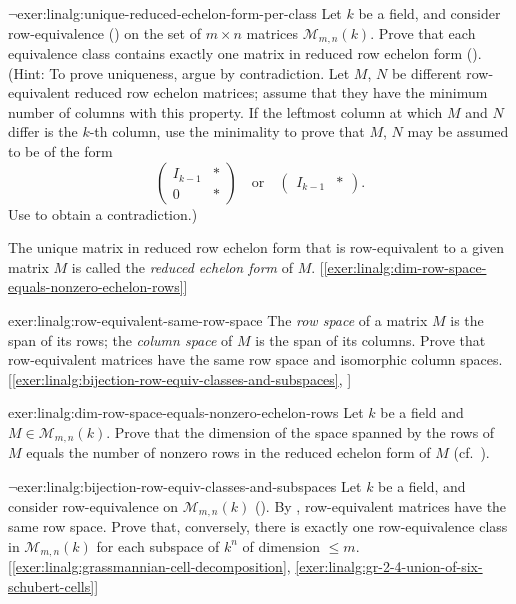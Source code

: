 \begin{exer}{$\lnot$}{exer:linalg:unique-reduced-echelon-form-per-class}
  Let $k$ be a field, and consider row-equivalence
  () on the
  set of $m \times n$ matrices $\mathcal{M}_{m,n}(k)$. Prove that each
  equivalence class contains exactly one matrix in reduced row echelon
  form
  (). (Hint:
  To prove uniqueness, argue by contradiction. Let $M$, $N$ be
  different row-equivalent reduced row echelon matrices; assume that
  they have the minimum number of columns with this property. If the
  leftmost column at which $M$ and $N$ differ is the $k$-th column,
  use the minimality to prove that $M$, $N$ may be assumed to be of
  the form
  \[
    \left(\begin{array}{c|c} I_{k-1} & * \\ \hline 0 &
        * \end{array}\right) \quad \text{or} \quad
    \left(\begin{array}{c|c} I_{k-1} & * \end{array}\right).
  \]
  Use  to
  obtain a contradiction.)

  The unique matrix in reduced row echelon form that is row-equivalent
  to a given matrix $M$ is called the \emph{reduced echelon form} of
  $M$.  [\ref{exer:linalg:dim-row-space-equals-nonzero-echelon-rows}]
\end{exer}
\begin{exer}{\exerused}{exer:linalg:row-equivalent-same-row-space}
  The \emph{row space} of a matrix $M$ is the span of its rows; the
  \emph{column space} of $M$ is the span of its columns. Prove that
  row-equivalent matrices have the same row space and isomorphic
  column
  spaces. [\ref{exer:linalg:bijection-row-equiv-classes-and-subspaces},
  ]
\end{exer}
\begin{exer}{}{exer:linalg:dim-row-space-equals-nonzero-echelon-rows}
  Let $k$ be a field and $M \in \mathcal{M}_{m,n}(k)$. Prove that the
  dimension of the space spanned by the rows of $M$ equals the number
  of nonzero rows in the reduced echelon form of $M$ (cf.\
  ).
\end{exer}
\begin{exer}{$\lnot$}{exer:linalg:bijection-row-equiv-classes-and-subspaces}
  Let $k$ be a field, and consider row-equivalence on
  $\mathcal{M}_{m,n}(k)$
  (). By
  \Cref{exer:linalg:row-equivalent-same-row-space}, row-equivalent
  matrices have the same row space. Prove that, conversely, there is
  exactly one row-equivalence class in $\mathcal{M}_{m,n}(k)$ for each
  subspace of $k^n$ of dimension $\leq
  m$. [\ref{exer:linalg:grassmannian-cell-decomposition},
  \ref{exer:linalg:gr-2-4-union-of-six-schubert-cells}]
\end{exer}
